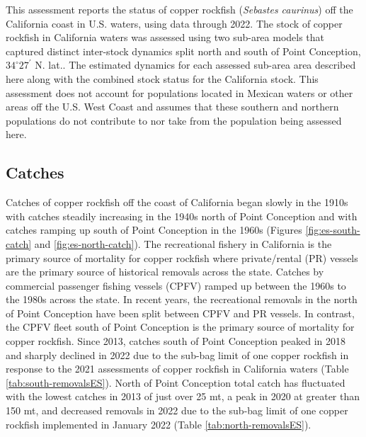 \documentclass[11pt,
  english,
  letterpaper,
]{article}
\begin{document}
This assessment reports the status of copper rockfish (\emph{Sebastes caurinus}) off the California coast in U.S. waters, using data through 2022. The stock of copper rockfish in California waters was assessed using two sub-area models that captured distinct inter-stock dynamics split north and south of Point Conception, $34^\circ 27^\prime$ N. lat.. The estimated dynamics for each assessed sub-area area described here along with the combined stock status for the California stock. This assessment does not account for populations located in Mexican waters or other areas off the U.S. West Coast and assumes that these southern and northern populations do not contribute to nor take from the population being assessed here.

\hypertarget{catches}{%
\subsection*{Catches}\label{catches}}

Catches of copper rockfish off the coast of California began slowly in the 1910s with catches steadily increasing in the 1940s north of Point Conception and with catches ramping up south of Point Conception in the 1960s (Figures \ref{fig:es-south-catch} and \ref{fig:es-north-catch}). The recreational fishery in California is the primary source of mortality for copper rockfish where private/rental (PR) vessels are the primary source of historical removals across the state. Catches by commercial passenger fishing vessels (CPFV) ramped up between the 1960s to the 1980s across the state. In recent years, the recreational removals in the north of Point Conception have been split between CPFV and PR vessels. In contrast, the CPFV fleet south of Point Conception is the primary source of mortality for copper rockfish. Since 2013, catches south of Point Conception peaked in 2018 and sharply declined in 2022 due to the sub-bag limit of one copper rockfish in response to the 2021 assessments of copper rockfish in California waters (Table \ref{tab:south-removalsES}). North of Point Conception total catch has fluctuated with the lowest catches in 2013 of just over 25 mt, a peak in 2020 at greater than 150 mt, and decreased removals in 2022 due to the sub-bag limit of one copper rockfish implemented in January 2022 (Table \ref{tab:north-removalsES}).




\end{document}
